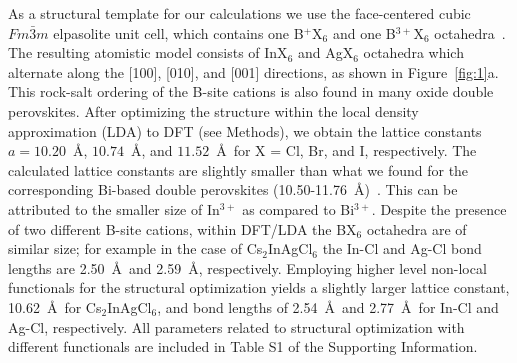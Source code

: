 \documentclass[journal=jpcl,manuscript=letter,layout=traditional]{achemso}
\begin{document}
As a structural template for our calculations we use the face-centered cubic $Fm\bar{3}m$
elpasolite unit cell, which contains one B$^{+}$X$_6$ and one B$^{3+}$X$_6$
octahedra~\cite{Volonakis2016,McClure2016}. The resulting atomistic model consists of
InX$_6$ and AgX$_6$ octahedra which alternate along the [100], [010], and [001] directions,
as shown in Figure~\ref{fig:1}a. This rock-salt ordering of the B-site cations is also found
in many oxide double perovskites. After optimizing the structure within
the local density approximation (LDA) to DFT (see Methods), we obtain the lattice constants
$a=10.20$~\AA, $10.74$~\AA, and $11.52$~\AA\ for X = Cl, Br, and I, respectively.
The calculated lattice constants are slightly smaller than what we found for the corresponding
Bi-based double perovskites (10.50-11.76~\AA)~\cite{Volonakis2016}. This can
be attributed to the smaller size of In$^{3+}$ as compared to Bi$^{3+}$. Despite the presence
of two different B-site cations, within DFT/LDA the BX$_6$ octahedra are of similar
size; for example in the case of Cs$_2$InAgCl$_6$ the In-Cl and Ag-Cl bond lengths are 2.50~\AA\
and 2.59~\AA, respectively. Employing higher level non-local functionals for
the structural optimization yields a slightly larger lattice constant, 10.62~\AA\ for Cs$_2$InAgCl$_6$,
and bond lengths of 2.54~\AA\ and 2.77~\AA\ for In-Cl and Ag-Cl, respectively.
All parameters related to structural optimization with different functionals are included
in Table S1 of the Supporting Information.
\end{document}
